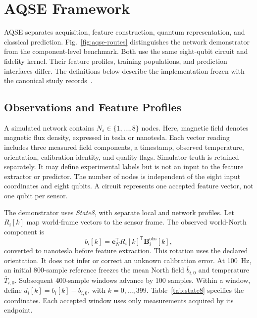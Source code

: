 \section{AQSE Framework}
\label{sec:framework}

AQSE separates acquisition, feature construction, quantum representation, and classical prediction. Fig.~\ref{fig:aqse-routes} distinguishes the network demonstrator from the component-level benchmark. Both use the same eight-qubit circuit and fidelity kernel. Their feature profiles, training populations, and prediction interfaces differ. The definitions below describe the implementation frozen with the canonical study records~\cite{aqse2026canonical}.



\subsection{Observations and Feature Profiles}
\label{sec:framework-observations}

A simulated network contains $N_s\in\{1,\ldots,8\}$ nodes. Here, magnetic field denotes magnetic flux density, expressed in tesla or nanotesla. Each vector reading includes three measured field components, a timestamp, observed temperature, orientation, calibration identity, and quality flags. Simulator truth is retained separately. It may define experimental labels but is not an input to the feature extractor or predictor. The number of nodes is independent of the eight input coordinates and eight qubits. A circuit represents one accepted feature vector, not one qubit per sensor.

The demonstrator uses \emph{State8}, with separate local and network profiles. Let $R_i[k]$ map world-frame vectors to the sensor frame. The observed world-North component is
\begin{equation}
 b_i[k]=\mathbf e_N^{\mathsf T}R_i[k]^{\mathsf T}
             \mathbf B_i^{\mathrm{obs}}[k],
 \label{eq:north-observation}
\end{equation}
converted to nanotesla before feature extraction. This rotation uses the declared orientation. It does not infer or correct an unknown calibration error. At 100~Hz, an initial 800-sample reference freezes the mean North field $\bar b_{i,0}$ and temperature $\bar T_{i,0}$. Subsequent 400-sample windows advance by 100 samples. Within a window, define $d_i[k]=b_i[k]-\bar b_{i,0}$, with $k=0,\ldots,399$. Table~\ref{tab:state8} specifies the coordinates. Each accepted window uses only measurements acquired by its endpoint.


